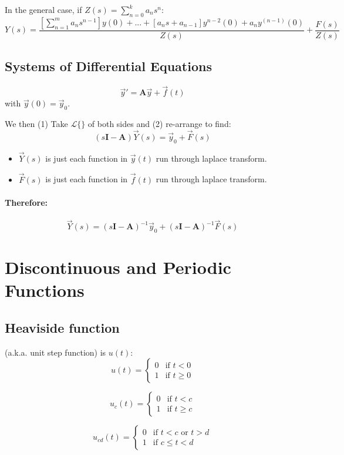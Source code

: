 \documentclass[a4paper,12pt]{report}
\begin{document}
In the general case, if $Z(s) = \sum_{n=0}^{k} a_ns^n$:
$$Y(s) = \frac{ [\sum_{n=1}^m a_n s^{n-1}] y(0) + ... + [a_ns + a_{n-1}]y^{n-2}(0) + a_n y^{(n-1)}(0) }{Z(s)} + \frac{F(s)}{Z(s)}$$

\subsection{Systems of Differential Equations}
$$\vec{y}' = \pmb{A}\vec{y} + \vec{f}(t)$$ with $\vec{y}(0) = \vec{y}_0$.

We then (1) Take $\mathcal{L} \{\}$ of both sides and (2) re-arrange to find:
$$(s\pmb{I} - \pmb{A})\vec{Y}(s) = \vec{y}_0 + \vec{F}(s)$$
\begin{itemize}
\item $\vec{Y}(s)$ is just each function in $\vec{y}(t)$ run through laplace transform.
\item $\vec{F}(s)$ is just each function in $\vec{f}(t)$ run through laplace transform.
\end{itemize}

\paragraph{Therefore: } 
$$\vec{Y}(s) = (s\pmb{I} - \pmb{A})^{-1} \vec{y}_0 + (s\pmb{I} - \pmb{A})^{-1}\vec{F}(s) $$

\section{Discontinuous and Periodic Functions}
\subsection{Heaviside function}
(a.k.a. unit step function) is $u(t)$:
\[ u(t) =
\begin{cases}
0 & \text{if } t < 0 \\
1 & \text{if } t \geq 0
\end{cases}
\] 

\[ u_c(t) =
\begin{cases}
0 & \text{if } t < c \\
1 & \text{if } t \geq c
\end{cases}
\] 

\[ u_{cd}(t) =
\begin{cases}
0 & \text{if } t < c \text{ or } t > d \\
1 & \text{if } c \leq t < d
\end{cases}
\] 
\end{document}
